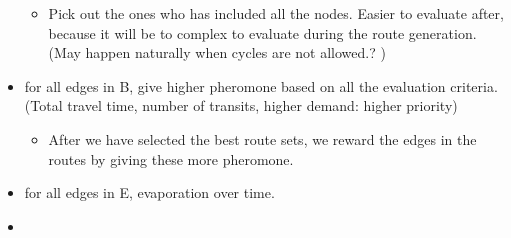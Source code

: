 \begin{itemize}
\begin{itemize}
\item Pick out the ones who has included all the nodes. Easier to evaluate after, because it will be to complex to evaluate during the route generation. (May happen naturally when cycles are not allowed.? )
\end{itemize}
\item for all edges in B, give higher pheromone based on all the evaluation criteria. (Total travel time, number of transits, higher demand: higher priority)
\begin{itemize}
\item After we have selected the best route sets, we reward the edges in the routes by giving these more pheromone.
\end{itemize}
\item for all edges in E, evaporation over time. 
\item 
\end{itemize}

